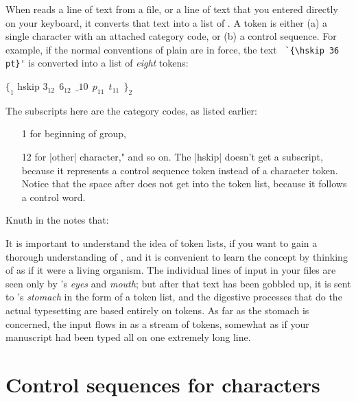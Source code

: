 When \tex reads a line of text from a file, or a line of text that you entered
directly on your keyboard, it converts that text into a list of \cmd{\tokens}. A
token is either (a) a single character with an attached category code, or (b) a control
sequence. For example, if the normal conventions of plain \tex  are in force, the text
\verb*+ `{\hskip 36 pt}'+  is converted into a list of \textit{eight} tokens:
\medskip

$ \{_{1}$ hskip $3_{12}~~6_{12}~~\_{10}~~p_{11}~~t_{11}~~\}_2 $

\medskip
The subscripts here are the category codes, as listed earlier:
\begin{itemize}
\item[1] for beginning of group,
\item[12] for |other| character," and so on. The |hskip| doesn't get a subscript, because it
represents a control sequence token instead of a character token. Notice that the space
after  does not get into the token list, because it follows a control word.
\end{itemize}

Knuth in the \texbook notes that:

\begin{latexquotation}

It is important to understand the idea of token lists, if you want to gain a
thorough understanding of \tex, and it is convenient to learn the concept by
thinking of \tex as if it were a living organism. The individual lines of input in your
files are seen only by \tex's \textit{eyes} and \textit{mouth}; but after that text has been gobbled
up, it is sent to \tex's \textit{stomach} in the form of a token list, and the digestive processes
that do the actual typesetting are based entirely on tokens. As far as the stomach is
concerned, the input 
flows in as a stream of tokens, somewhat as if your \tex manuscript
had been typed all on one extremely long line.
\end{latexquotation}

\section{Control sequences for characters}

